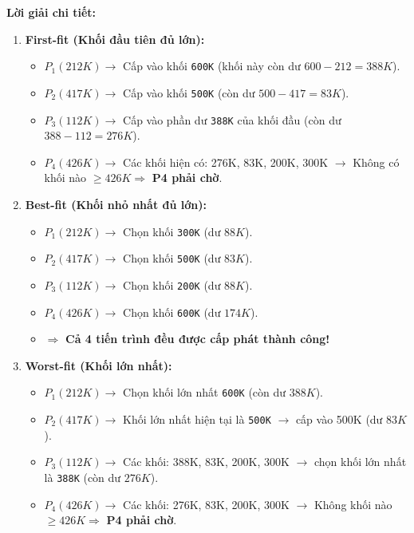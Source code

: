\documentclass[11pt,a4paper]{article}
\begin{document}
\textbf{Lời giải chi tiết:}
\begin{enumerate}
    \item \textbf{First-fit (Khối đầu tiên đủ lớn):}
    \begin{itemize}[noitemsep]
        \item $P_1 (212K) \rightarrow$ Cấp vào khối \texttt{600K} (khối này còn dư $600 - 212 = 388K$).
        \item $P_2 (417K) \rightarrow$ Cấp vào khối \texttt{500K} (còn dư $500 - 417 = 83K$).
        \item $P_3 (112K) \rightarrow$ Cấp vào phần dư \texttt{388K} của khối đầu (còn dư $388 - 112 = 276K$).
        \item $P_4 (426K) \rightarrow$ Các khối hiện có: 276K, 83K, 200K, 300K $\rightarrow$ Không có khối nào $\ge 426K \Rightarrow$ \textbf{P4 phải chờ}.
    \end{itemize}
    \item \textbf{Best-fit (Khối nhỏ nhất đủ lớn):}
    \begin{itemize}[noitemsep]
        \item $P_1 (212K) \rightarrow$ Chọn khối \texttt{300K} (dư $88K$).
        \item $P_2 (417K) \rightarrow$ Chọn khối \texttt{500K} (dư $83K$).
        \item $P_3 (112K) \rightarrow$ Chọn khối \texttt{200K} (dư $88K$).
        \item $P_4 (426K) \rightarrow$ Chọn khối \texttt{600K} (dư $174K$).
        \item $\Rightarrow$ \textbf{Cả 4 tiến trình đều được cấp phát thành công!}
    \end{itemize}
    \item \textbf{Worst-fit (Khối lớn nhất):}
    \begin{itemize}[noitemsep]
        \item $P_1 (212K) \rightarrow$ Chọn khối lớn nhất \texttt{600K} (còn dư $388K$).
        \item $P_2 (417K) \rightarrow$ Khối lớn nhất hiện tại là \texttt{500K} $\rightarrow$ cấp vào 500K (dư $83K$).
        \item $P_3 (112K) \rightarrow$ Các khối: 388K, 83K, 200K, 300K $\rightarrow$ chọn khối lớn nhất là \texttt{388K} (còn dư $276K$).
        \item $P_4 (426K) \rightarrow$ Các khối: 276K, 83K, 200K, 300K $\rightarrow$ Không khối nào $\ge 426K \Rightarrow$ \textbf{P4 phải chờ}.
    \end{itemize}

\end{enumerate}
\end{document}
